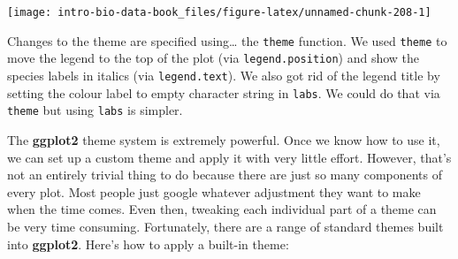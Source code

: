 \documentclass[
]{book}
\begin{document}
\begin{center}\texttt{[image: intro-bio-data-book\_files/figure-latex/unnamed-chunk-208-1]} \end{center}

Changes to the theme are specified using\ldots{} the \texttt{theme} function. We used \texttt{theme} to move the legend to the top of the plot (via \texttt{legend.position}) and show the species labels in italics (via \texttt{legend.text}). We also got rid of the legend title by setting the colour label to empty character string in \texttt{labs}. We could do that via \texttt{theme} but using \texttt{labs} is simpler.

The \textbf{ggplot2} theme system is extremely powerful. Once we know how to use it, we can set up a custom theme and apply it with very little effort. However, that's not an entirely trivial thing to do because there are just so many components of every plot. Most people just google whatever adjustment they want to make when the time comes. Even then, tweaking each individual part of a theme can be very time consuming. Fortunately, there are a range of standard themes built into \textbf{ggplot2}. Here's how to apply a built-in theme:
\end{document}
